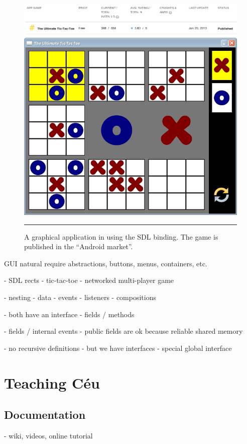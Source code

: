 \begin{figure}[t]
\centering
\includegraphics[scale=0.45]{play.png}
\includegraphics[scale=0.55]{scX.png}
\rule{14cm}{0.37pt}
\caption{ A graphical application in \CEU using the SDL binding.
          The game is published in the ``Android market''.
\label{lst.orgs}
}
\end{figure}

GUI natural
require abstractions, buttons, menus, containers, etc.

- SDL rects
- tic-tac-toe
- networked multi-player game


- nesting
    - data
    - events
    - listeners
    - compositions

- both have an interface
- fields / methods

- fields / internal events
- public fields are ok because reliable shared memory

- no recursive definitions
- but we have interfaces
- special global interface

\section{Teaching C\'eu}

\subsection{Documentation}
    - wiki, videos, online tutorial

